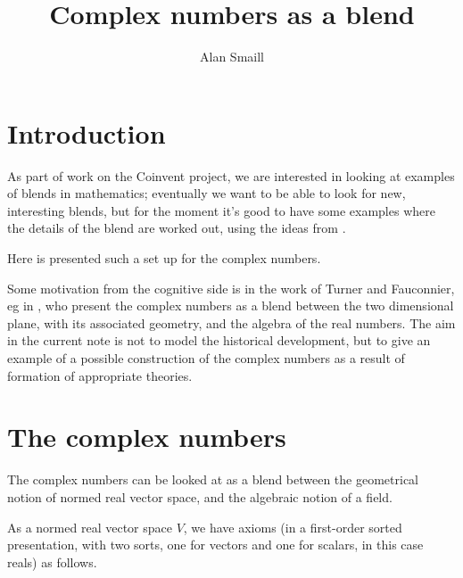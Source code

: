 \documentclass{my-blue-book}
\title{Complex numbers as a blend}
\author{Alan Smaill}
\begin{document}
\maketitle

\section{Introduction}

As part of work on the Coinvent project, we are interested in looking
at examples of blends in mathematics;  eventually we want to
be able to look for new, interesting blends, but for the moment 
it's good to have some examples where the details of the
blend are worked out, using the ideas from \textcite{Gog05}.

Here is presented such a set up for the complex numbers.

Some motivation from the cognitive side is in the work of Turner and
Fauconnier, eg in \textcite{Fau02}, who present the complex numbers as a
blend between the two dimensional plane, with its associated geometry,
and the algebra of the real numbers.  The aim in the current note is
not to model the historical development, but to give an example
of a possible construction of the complex numbers as a result
of formation of appropriate theories.

\section{The complex numbers}
\label{sec:complex-numbers}

The complex numbers can be looked at as a blend between the
geometrical notion of normed real vector space, and the algebraic
notion of a field.

As a normed real vector space $V$, we have axioms (in a first-order
sorted presentation, with two sorts, one for vectors and one for
scalars, in this case reals) as follows.
\end{document}
